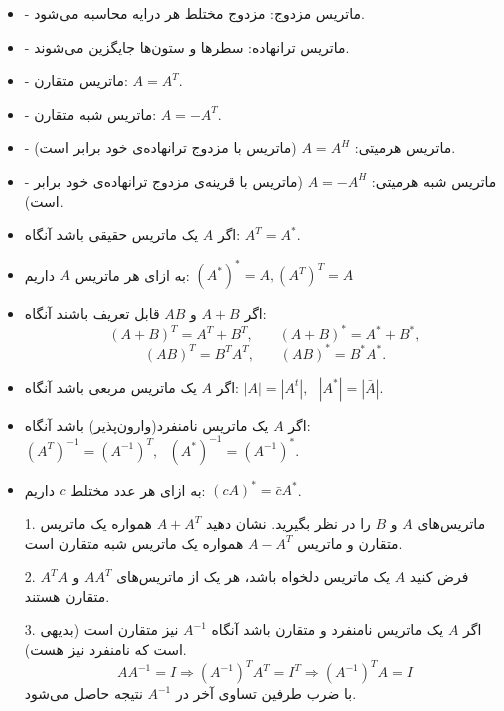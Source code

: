 	\begin{nokteh}
		\begin{itemize}
			\item 
	- ماتریس مزدوج: مزدوج مختلط هر درایه محاسبه می‌شود.
	\item
	- ماتریس ترانهاده: سطرها و ستون‌ها جایگزین می‌شوند.
	\item 
	- ماتریس متقارن: \( A = A^T \).
	\item
	- ماتریس شبه متقارن: \( A = -A^T \).
	\item
	- ماتریس هرمیتی: \( A = A^H \) (ماتریس با مزدوج ترانهاده‌ی خود برابر است).
	\item
	- ماتریس شبه هرمیتی: \( A = -A^H \) (ماتریس با قرینه‌ی مزدوج ترانهاده‌ی خود برابر است).	
		\end{itemize}
	\end{nokteh}
	
	
	
	\begin{nokteh}
\begin{itemize}
	\item  اگر 
	$ A $
	یک ماتریس حقیقی باشد آنگاه: 
	$ A^T=A^*$. 
	\item
	به ازای هر ماتریس 
	$A$
	داریم: 
	$(A^*)^*=A , (A^T)^T=A$
	\item
	 اگر 
	 $A+B$
	 و 
	 $AB$
	 قابل تعریف باشند آنگاه:
	 \[ (A+B)^T=A^T+B^T, ~~~~~~~~ (A+B)^*=A^*+B^*,\]
	 \[ (AB)^T=B^TA^T, ~~~~~~~~ (AB)^*=B^*A^* .\]
	 \item 
	 اگر 
	 $A$
	 یک ماتریس مربعی باشد آنگاه: 
	 $|A| = |A^t|,~~~ |A^*| = |\bar{A}|$.
	 \item 
	 اگر
	 $A$
	 یک ماتریس نامنفرد(وارون‌پذیر) باشد آنگاه:
	$(A^T)^{-1}=(A^{-1})^T,~~~(A^*)^{-1}=(A^{-1})^*$.
	\item 
	به ازای هر عدد مختلط 
	$c$
	داریم: 
	$(cA)^*=\bar{c}A^*$.
\end{itemize}
	\end{nokteh}
	
\begin{example}
	\begin{itemize}
		\item [1. ] 
		ماتریس‌های 
		$A$
		و 
		$B$
		را در نظر بگیرید. نشان دهید 
		$A+A^T$
		همواره یک ماتریس متقارن و ماتریس
			$A-A^T$
		همواره یک ماتریس شبه متقارن است.
		\item[2. ] 
		 فرض کنید 
		 $A$
		 یک ماتریس دلخواه باشد، هر یک از ماتریس‌های 
		 $AA^T$
		 و
		 $A^TA$
		 متقارن هستند.
		 \item [3. ]
		  اگر 
		  $A$
		  یک ماتریس نامنفرد و متقارن باشد آنگاه
		 $A^{-1}$
		  نیز متقارن است (بدیهی است که نامنفرد نیز هست).
		  \[ AA^{-1}=I \Longrightarrow (A^{-1})^TA^T=I^T\Longrightarrow(A^{-1})^TA=I \]
		  با ضرب طرفین تساوی آخر در 
		  $A^{-1}$
		  نتیجه حاصل می‌شود.
	\end{itemize}
\end{example}

